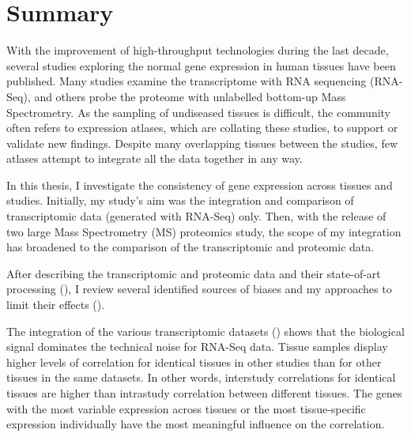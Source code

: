 \clearpage
\chapter*{Summary}\label{ch:summary}
\vspace{-1cm}
\begin{singlespace}
    {\small With the improvement of high-throughput technologies
    during the last decade,
    several studies exploring the normal gene expression in human tissues
    have been published.
    Many studies examine the transcriptome with RNA sequencing (RNA-Seq),
    and others probe the proteome with unlabelled bottom-up Mass Spectrometry.
    As the sampling of undiseased tissues is difficult,
    the community often refers to expression atlases,
    which are collating these studies,
    to support or validate new findings.
    Despite many overlapping tissues between the studies,
    few atlases attempt to integrate all the data together in any way.\mybr\

    In this thesis, I investigate the consistency of gene expression
    across tissues and studies.
    Initially, my study's aim was
    the integration and comparison of transcriptomic data
    (generated with RNA-Seq) only.
    Then, with the release of two large Mass Spectrometry (MS) proteomics study,
    the scope of my integration has broadened
    to the comparison of the transcriptomic and proteomic data.\mybr\

    After describing the transcriptomic and proteomic data
    and their state-of-art processing (),
    I review several identified sources of biases
    and my approaches to limit their effects ().\mybr\

    The integration of the various transcriptomic datasets ()
    shows that
    the biological signal dominates the technical noise for RNA-Seq data.
    Tissue samples display higher levels of correlation
    for identical tissues in other studies than
    for other tissues in the same datasets.
    In other words, interstudy correlations for identical tissues
    are higher than intrastudy correlation between different tissues.
    The genes with the most variable expression across tissues
    or the most tissue-specific expression individually have
    the most meaningful influence on the correlation.\mybr\

}
\end{singlespace}
